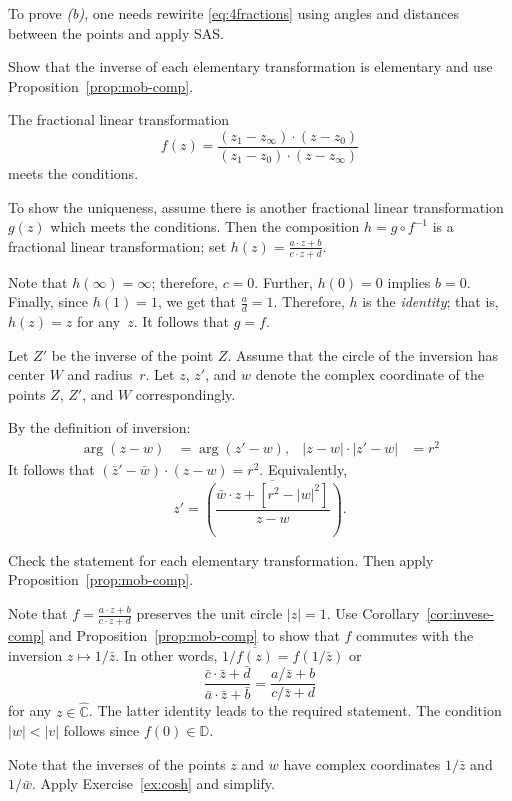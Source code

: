 To prove \textit{(b)}, one needs rewirite \ref{eq:4fractions} using angles and distances between the points and apply SAS.

Show that the inverse of each elementary transformation is elementary
and use Proposition~\ref{prop:mob-comp}.

The fractional linear transformation
\[f(z)=\frac{(z_1-z_\infty)\cdot(z-z_0)}{(z_1-z_0)\cdot(z-z_\infty)}\]
meets the conditions.

To show the uniqueness, assume there is another fractional linear transformation
$g(z)$ which meets the conditions.
Then the composition
$h=g\circ f^{-1}$ 
is a fractional linear transformation; set
$h(z)=\tfrac{a\cdot z+b}{c\cdot z+d}$.

Note that $h(\infty)=\infty$;
therefore, $c=0$.
Further, $h(0)=0$ implies $b=0$.
Finally, since $h(1)=1$, we get that $\tfrac ad=1$.
Therefore, $h$ is the \emph{identity};
that is, $h(z)=z$ for any~$z$.
It follows that $g=f$.

Let $Z'$ be the inverse of the point $Z$.
Assume that the circle of the inversion has center $W$ and radius~$r$.
Let $z$, $z'$, and $w$ denote the complex coordinate of the points $Z$, $Z'$, and $W$ correspondingly.

By the definition of inversion:
\begin{align*}
\arg (z-w)&=\arg (z'-w),
&
|z-w|\cdot|z'-w|&=r^2
\end{align*}
It follows that $(\bar z'-\bar w)\cdot ( z- w)= r^2$.
Equivalently,
\[z'=\overline{\left(\frac{\bar w\cdot z+[r^2-|w|^2]}{z- w}\right)}.\]

 
Check the statement for each elementary transformation.
Then apply Proposition~\ref{prop:mob-comp}.

Note that $f=\tfrac{a\cdot z+b}{c\cdot z+d}$ preserves the unit circle $|z|=1$.
Use Corollary~\ref{cor:invese-comp} and Proposition~\ref{prop:mob-comp} to show that $f$ commutes with the inversion $z\mapsto 1/\bar z$.
In other words, $1/\overline{f(z)}=f(1/\bar z)$ or
\[\frac{\bar c\cdot \bar z+\bar d}{\bar a\cdot \bar z+\bar b}
=\frac{a/\bar z+b}{c/\bar z+d}\]
for any $z\in\hat{\mathbb{C}}$.
The latter identity leads to the required statement. 
The condition $|w|<|v|$ follows since $f(0)\in\mathbb{D}$.

Note that the inverses of the points $z$ and $w$ have complex coordinates $1/\bar z$ and $1/\bar w$.
Apply Exercise~\ref{ex:cosh} and simplify.

